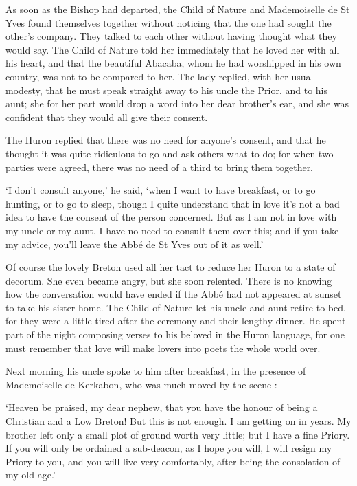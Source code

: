 \documentclass{article}
\begin{document}
\begin{center}
As soon as the Bishop had departed, the Child of Nature and Mademoiselle de St 
Yves found themselves together without noticing that the one had sought the other's 
company. They talked to each other without having thought what they would say. 
The Child of Nature told her immediately that he loved her with all his heart, 
and that the beautiful Abacaba, whom he had worshipped in his own country, was 
not to be compared to her. The lady replied, with her usual modesty, that he must 
speak straight away to his uncle the Prior, and to his aunt; she for her part would 
drop a word into her dear brother's ear, and she was confident that they would 
all give their consent. 

The Huron replied that there was no need for anyone's consent, and that he thought 
it was quite ridiculous to go and ask others what to do; for when two parties were 
agreed, there was no need of a third to bring them together. 

`I don't consult anyone,' he said, `when I want to have breakfast, or to go hunting, 
or to go to sleep, though I quite understand that in love it's not a bad idea to 
have the consent of the person concerned. But as I am not in love with my uncle 
or my aunt, I have no need to consult them over this; and if you take my advice, 
you'll leave the Abbé de St Yves out of it as well.' 

Of course the lovely Breton used all her tact to reduce her Huron to a state of 
decorum. She even became angry, but she soon relented. There is no knowing how 
the conversation would have ended if the Abbé had not appeared at sunset to take 
his sister home. The Child of Nature let his uncle and aunt retire to bed, for 
they were a little tired after the ceremony and their lengthy dinner. He spent 
part of the night composing verses to his beloved in the Huron language, for one 
must remember that love will make lovers into poets the whole world over. 

Next morning his uncle spoke to him after breakfast, in the presence of Mademoiselle 
de Kerkabon, who was much moved by the scene : 

`Heaven be praised, my dear nephew, that you have the honour of being a Christian 
and a Low Breton! But this is not enough. I am getting on in years. My brother 
left only a small plot of ground worth very little; but I have a fine Priory. If 
you will only be ordained a sub-deacon, as I hope you will, I will resign my Priory 
to you, and you will live very comfortably, after being the consolation of my old 
age.' 


\end{center}
\end{document}
